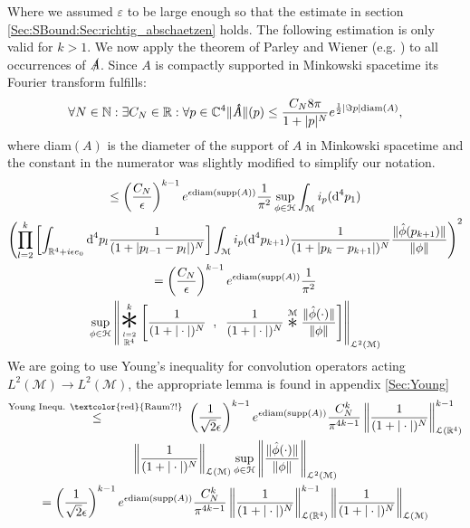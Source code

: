 \documentclass[b5paper,draft,openbib,12pt]{memoir}
\newcommand{\letext}[1]{\ensuremath{\stackrel{\text{#1}}{\le}}}
\newcommand{\Conv}{\mathop{\scalebox{1.7}{\raisebox{-0.2ex}{\(\ast\)}}}}
\newcommand{\CONV}{\mathop{\scalebox{3.0}{\raisebox{-0.2ex}{\(\ast\)}}}}
\begin{document}
 Where we assumed \(\varepsilon\) to be large enough so that the estimate in section 
 \ref{Sec:SBound:Sec:richtig_abschaetzen} holds.  The following estimation is only valid 
 for \(k>1\). We now apply the theorem of Parley and Wiener (e.g. \cite{reed1975methods})
  to all occurrences of  \(\slashed{A}\).  Since \(A\) is compactly supported in Minkowski
  spacetime its Fourier transform fulfills:
  \begin{equation}
  \forall N \in \mathbb{N}: \exists C_N\in\mathbb{R}: \forall p \in \mathbb{C}^4 \| \slashed{\hat{A}}\|(p) \le \frac{C_N 8 \pi }{1+|p|^N} e^{\frac{1}{2}\left|\Im p \right| \text{diam}(A) },
  \end{equation}
where diam\((A)\) is the diameter of the support of \(A\) in Minkowski spacetime 
and the constant in the numerator was slightly modified to simplify our notation. 
 \begin{multline}
\le \left(\frac{C_N}{\epsilon}\right)^{k-1} e^{\epsilon \text{diam}(\text{supp}(A)) } \frac{1}{\pi^2}  \sup_{\phi\in\mathcal{H}}\int_{\mathcal{M}} i_p(\text{d}^4p_1) \\ 
 \left(\prod_{l=2}^{k} \left[ \int_{\mathbb{R}^4+i \epsilon e_0} \text{d}^4p_l \frac{1}{(1+|p_{l-1}-p_l |)^N}
 \right] \int_{\mathcal{M}}  i_p(\text{d}^4p_{k+1})\frac{1}{(1+|p_{k}-p_{k+1} |)^N}\frac{\|\hat{\phi}(p_{k+1})\|}{\|\phi\|}\right)^2\\
= \left(\frac{C_N}{\epsilon}\right)^{k-1} e^{\epsilon \text{diam}(\text{supp}(A)) } \frac{1}{\pi^2}\\
  \sup_{\phi\in\mathcal{H}} \left\| 
\CONV_{\stackrel{l=2}{\mathbb{R}^4}}^{k} \left[  \frac{1}{(1+|\cdot |)^N}
  \hspace{0.2cm} ,\hspace{0.2cm}  \frac{1}{(1+|\cdot |)^N}\stackrel{\mathcal{M}}{\Conv}\frac{\|\hat{\phi}(\cdot)\|}{\|\phi\|}\right] \right\|_{\mathcal{L}^2(\mathcal{M})}
  \end{multline}
  We are going to use Young's inequality for convolution operators acting 
  \(L^2(\mathcal{M})\rightarrow L^2(\mathcal{M})\), the appropriate 
  lemma is found in appendix \ref{Sec:Young}
  \begin{multline}
  \letext{Young Inequ. \textcolor{red}{Raum?!} } \left(\frac{1}{\sqrt{2} \epsilon}\right)^{k-1} e^{\epsilon \text{diam}(\text{supp}(A)) } \frac{ C_N^k}{\pi^{4k-1}}  \left\|\frac{1}{(1+|\cdot |)^N} \right\|_{\mathcal{L}(\mathbb{R}^4)}^{k-1}\\
    \left\|\frac{1}{(1+|\cdot |)^N} \right\|_{\mathcal{L}(\mathcal{M})}   \sup_{\phi\in\mathcal{H}} \left\| 
\frac{\|\hat{\phi}(\cdot)\|}{\|\phi\|}\right\|_{\mathcal{L}^2(\mathcal{M})}\\
= \left(\frac{1}{\sqrt{2} \epsilon}\right)^{k-1} e^{\epsilon \text{diam}(\text{supp}(A)) } \frac{ C_N^k}{\pi^{4k-1}}  \left\|\frac{1}{(1+|\cdot |)^N} \right\|_{\mathcal{L}(\mathbb{R}^4)}^{k-1}  \left\|\frac{1}{(1+|\cdot |)^N} \right\|_{\mathcal{L}(\mathcal{M})} 
\end{multline}
\end{document}
